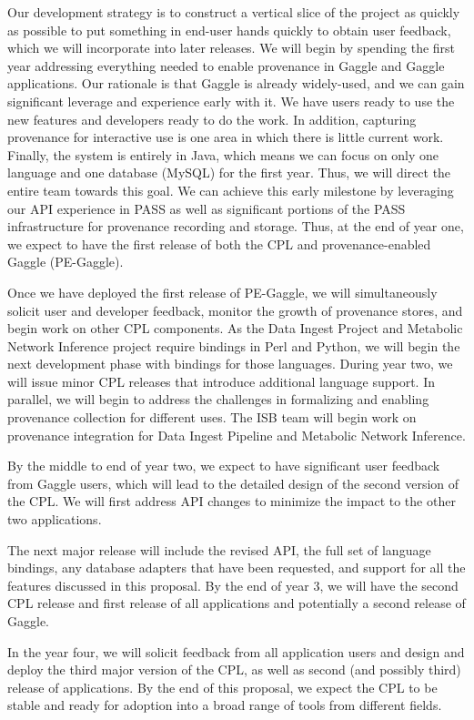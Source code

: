 \documentclass[10pt]{article}
\begin{document}
Our development strategy is to construct a vertical slice of the project
as quickly as possible to put something in end-user hands quickly
to obtain user feedback, which we will incorporate into later releases.
We will begin by spending the first year addressing everything
needed to enable provenance in Gaggle and Gaggle applications.
Our rationale is that Gaggle is already widely-used, and we can gain
significant leverage and experience early with it.
We have users ready to use the new features and developers ready to
do the work.
In addition, capturing provenance for interactive use is one area in
which there is little current work.
Finally, the system is entirely in Java, which means we can focus on
only one language and one database (MySQL) for the first year.
Thus, we will direct the entire team towards this goal.
We can achieve this early milestone by leveraging our API experience in
PASS as well as significant portions
of the PASS infrastructure for provenance recording and storage.
Thus, at the end of year one, we expect to have the first release of both
the CPL and provenance-enabled Gaggle (PE-Gaggle).

Once we have deployed the first release of PE-Gaggle,
we will simultaneously solicit user and developer feedback,
monitor the growth of provenance stores,
and begin work on other CPL components.
As the Data Ingest Project and Metabolic Network Inference project
require bindings in Perl and Python, we will begin the next development
phase with bindings for those languages.
During year two, we will issue minor CPL releases that introduce
additional language support.
In parallel, we will begin to address the challenges
in formalizing and enabling provenance collection for different uses.
The ISB team will begin work on provenance integration for
Data Ingest Pipeline and Metabolic Network Inference.

By the middle to end of year two, we expect to have
significant user feedback from Gaggle users,
which will lead to the detailed design of the second version
of the CPL.
We will first address API changes to minimize the impact
to the other two applications.

The next major release will include the revised API, the full set of
language bindings, any database adapters that have been requested,
and support for all the features discussed in this proposal.
By the end of year 3, we will have the second CPL release and first
release of all applications and potentially a second release of Gaggle.

In the year four, we will solicit feedback from all application users
and design and deploy the third major version of the CPL, as well as second
(and possibly third) release of applications.
By the end of this proposal, we expect the CPL to be stable and ready for
adoption into a broad range of tools from different fields.
\end{document}
